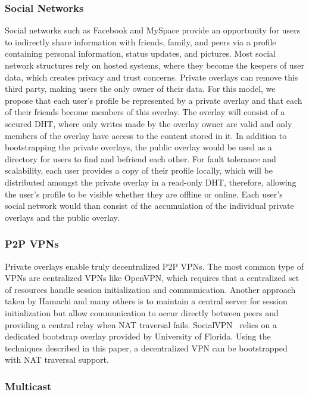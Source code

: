 \documentclass[conference]{IEEEtran}
\begin{document}
\subsubsection{Social Networks}

Social networks such as Facebook and MySpace provide an opportunity for users
to indirectly share information with friends, family, and peers via a profile
containing personal information, status updates, and pictures.  Most social
network structures rely on hosted systems, where they become the keepers of
user data, which creates privacy and trust concerns.  Private overlays can
remove this third party, making users the only owner of their data.  For this
model, we propose that each user's profile be represented by a private overlay
and that each of their friends become members of this overlay.  The overlay
will consist of a secured DHT, where only writes made by the overlay owner are
valid and only members of the overlay have access to the content stored in it.
In addition to bootstrapping the private overlays, the public overlay would be
used as a directory for users to find and befriend each other.  For fault
tolerance and scalability, each user provides a copy of their profile locally,
which will be distributed amongst the private overlay in a read-only DHT,
therefore, allowing the user's profile to be visible whether they are offline
or online.  Each user's social network would than consist of the accumulation
of the individual private overlays and the public overlay.

\subsubsection{P2P VPNs}

Private overlays enable truly decentralized P2P VPNs.  The most common type of
VPNs are centralized VPNs like OpenVPN, which requires that a centralized set
of resources handle session initialization and communication.  Another approach
taken by Hamachi and many others is to maintain a central server for session
initialization but allow communication to occur directly between peers and
providing a central relay when NAT traversal fails.  SocialVPN~\cite{socialvpn}
relies on a dedicated bootstrap overlay provided by University of Florida.
Using the techniques described in this paper, a decentralized VPN can be
bootstrapped with NAT traversal support.

\subsubsection{Multicast}
\end{document}

